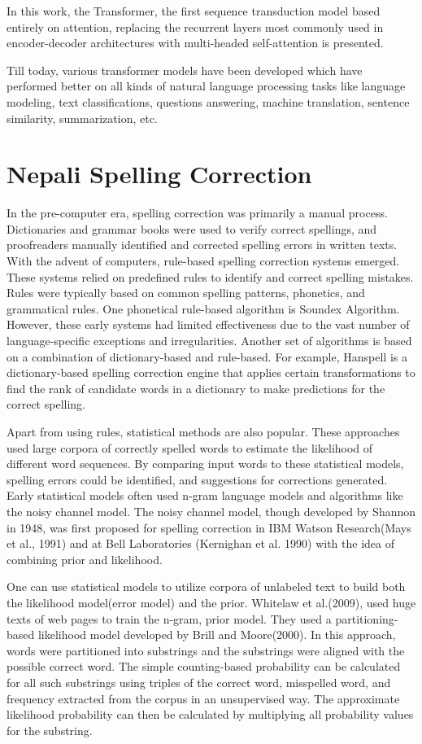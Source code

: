 In this work, the Transformer, the first sequence transduction model based entirely on attention, replacing the recurrent layers most commonly used in encoder-decoder architectures with multi-headed self-attention is presented.

Till today, various transformer models have been developed which have performed better on all kinds of natural language processing tasks like language modeling, text classifications, questions answering, machine translation, sentence similarity, summarization, etc.

\section{Nepali Spelling Correction}
In the pre-computer era, spelling correction was primarily a manual process. Dictionaries and grammar books were used to verify correct spellings, and proofreaders manually identified and corrected spelling errors in written texts. With the advent of computers, rule-based spelling correction systems emerged. These systems relied on predefined rules to identify and correct spelling mistakes. Rules were typically based on common spelling patterns, phonetics, and grammatical rules. One phonetical rule-based algorithm is Soundex Algorithm. However, these early systems had limited effectiveness due to the vast number of language-specific exceptions and irregularities. Another set of algorithms is based on a combination of dictionary-based and rule-based. For example, Hanspell is a dictionary-based spelling correction engine that applies certain transformations to find the rank of candidate words in a dictionary to make predictions for the correct spelling.

Apart from using rules, statistical methods are also popular. These approaches used large corpora of correctly spelled words to estimate the likelihood of different word sequences. By comparing input words to these statistical models, spelling errors could be identified, and suggestions for corrections generated. Early statistical models often used n-gram language models and algorithms like the noisy channel model.
The noisy channel model, though developed by Shannon in 1948, was first proposed for spelling correction in IBM Watson Research(Mays et al., 1991) and at Bell Laboratories (Kernighan et al. 1990) with the idea of combining prior and likelihood.

One can use statistical models to utilize corpora of unlabeled text to build both the likelihood model(error model) and the prior. Whitelaw et al.(2009), used huge texts of web pages to train the n-gram, prior model. They used a partitioning-based likelihood model developed by Brill and Moore(2000). In this approach, words were partitioned into substrings and the substrings were aligned with the possible correct word. The simple counting-based probability can be calculated for all such substrings using triples of the correct word, misspelled word, and frequency extracted from the corpus in an unsupervised way. The approximate likelihood probability can then be calculated by multiplying all probability values for the substring.

